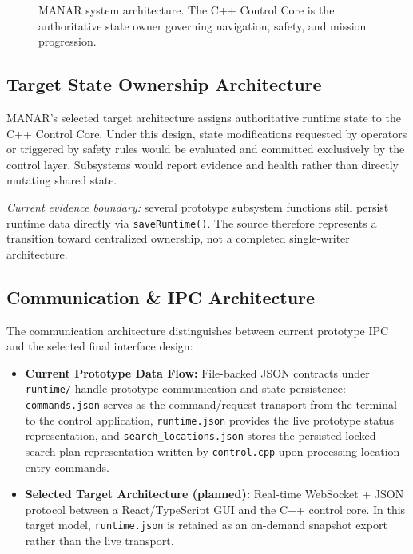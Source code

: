 \begin{figure}[t]
{%
}
\caption{MANAR system architecture. The C++ Control Core is the authoritative state owner governing navigation, safety, and mission progression.}
\label{fig:system_architecture}
\end{figure}

\subsection{Target State Ownership Architecture}
MANAR's selected target architecture assigns authoritative runtime state to the C++ Control Core. Under this design, state modifications requested by operators or triggered by safety rules would be evaluated and committed exclusively by the control layer. Subsystems would report evidence and health rather than directly mutating shared state.

\textit{Current evidence boundary:} several prototype subsystem functions still persist runtime data directly via \texttt{saveRuntime()}. The source therefore represents a transition toward centralized ownership, not a completed single-writer architecture.

\subsection{Communication \& IPC Architecture}
The communication architecture distinguishes between current prototype IPC and the selected final interface design:
\begin{itemize}
    \item \textbf{Current Prototype Data Flow:} File-backed JSON contracts under \texttt{runtime/} handle prototype communication and state persistence: \texttt{commands.json} serves as the command/request transport from the terminal to the control application, \texttt{runtime.json} provides the live prototype status representation, and \texttt{search\_locations.json} stores the persisted locked search-plan representation written by \texttt{control.cpp} upon processing location entry commands.
    \item \textbf{Selected Target Architecture (planned):} Real-time WebSocket + JSON protocol between a React/TypeScript GUI and the C++ control core. In this target model, \texttt{runtime.json} is retained as an on-demand snapshot export rather than the live transport.
\end{itemize}
